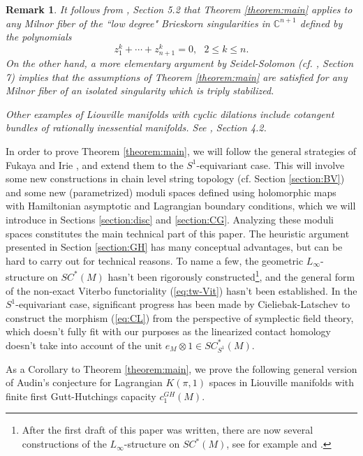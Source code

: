 \documentclass[a4paper]{article}
\newtheorem{remark}[theorem]{Remark}
\numberwithin{equation}{section}
\begin{document}
\begin{remark}\label{remark:example}
It follows from \cite{zz2}, Section 5.2 that Theorem \ref{theorem:main} applies to any Milnor fiber of the ``low degree" Brieskorn singularities in $\mathbb{C}^{n+1}$ defined by the polynomials
\begin{equation}
z_1^k+\cdots+z_{n+1}^k=0,\textrm{ }2\leq k\leq n.
\end{equation}
On the other hand, a more elementary argument by Seidel-Solomon (cf. \cite{ss}, Section 7) implies that the assumptions of Theorem \ref{theorem:main} are satisfied for any Milnor fiber of an isolated singularity which is triply stabilized.

Other examples of Liouville manifolds with cyclic dilations include cotangent bundles of rationally inessential manifolds. See \cite{yl2}, Section 4.2.
\end{remark}

In order to prove Theorem \ref{theorem:main}, we will follow the general strategies of Fukaya \cite{kf} and Irie \cite{ki2}, and extend them to the $S^1$-equivariant case. This will involve some new constructions in chain level string topology (cf. Section \ref{section:BV}) and some new (parametrized) moduli spaces defined using holomorphic maps with Hamiltonian asymptotic and Lagrangian boundary conditions, which we will introduce in Sections \ref{section:disc} and \ref{section:CG}. Analyzing these moduli spaces constitutes the main technical part of this paper. The heuristic argument presented in Section \ref{section:GH} has many conceptual advantages, but can be hard to carry out for technical reasons. To name a few, the geometric $L_\infty$-structure on $\mathit{SC}^\ast(M)$ hasn't been rigorously constructed\footnote{After the first draft of this paper was written, there are now several constructions of the $L_\infty$-structure on $\mathit{SC}^\ast(M)$, see for example \cite{beas} and \cite{pos}.}, and the general form of the non-exact Viterbo functoriality (\ref{eq:tw-Vit}) hasn't been established. In the $S^1$-equivariant case, significant progress has been made by Cieliebak-Latschev \cite{jlt} to construct the morphism (\ref{eq:CL}) from the perspective of symplectic field theory, which doesn't fully fit with our purposes as the linearized contact homology doesn't take into account of the unit $e_M\otimes1\in\mathit{SC}^\ast_{S^1}(M)$.

As a Corollary to Theorem \ref{theorem:main}, we prove the following general version of Audin's conjecture for Lagrangian $K(\pi,1)$ spaces in Liouville manifolds with finite first Gutt-Hutchings capacity $c_1^\mathit{GH}(M)$.
\end{document}
